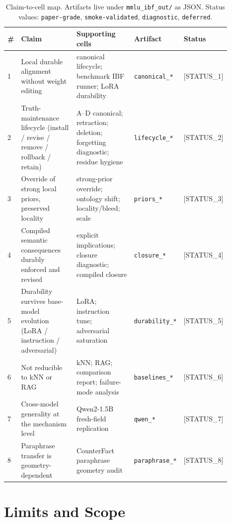 \documentclass[11pt,twocolumn]{article}
\newcommand{\PH}[1]{[\textsc{#1}]}
\theoremstyle{plain}
\begin{document}
\begin{table}[t]
\centering
\small
\setlength{\tabcolsep}{4pt}
\begin{tabular}{p{0.03\linewidth} p{0.30\linewidth} p{0.30\linewidth} p{0.13\linewidth} p{0.13\linewidth}}
\toprule
\# & Claim & Supporting cells & Artifact & Status \\
\midrule
1 & Local durable alignment without weight editing & canonical lifecycle; benchmark IBF runner; LoRA durability & \texttt{canonical\_*} & \PH{STATUS\_1} \\
2 & Truth-maintenance lifecycle (install / revise / remove / rollback / retain) & A--D canonical; retraction; deletion; forgetting diagnostic; residue hygiene & \texttt{lifecycle\_*} & \PH{STATUS\_2} \\
3 & Override of strong local priors, preserved locality & strong-prior override; ontology shift; locality/bleed; scale & \texttt{priors\_*} & \PH{STATUS\_3} \\
4 & Compiled semantic consequences durably enforced and revised & explicit implications; closure diagnostic; compiled closure & \texttt{closure\_*} & \PH{STATUS\_4} \\
5 & Durability survives base-model evolution (LoRA / instruction / adversarial) & LoRA; instruction tune; adversarial saturation & \texttt{durability\_*} & \PH{STATUS\_5} \\
6 & Not reducible to kNN or RAG & kNN; RAG; comparison report; failure-mode analysis & \texttt{baselines\_*} & \PH{STATUS\_6} \\
7 & Cross-model generality at the mechanism level & Qwen2-1.5B fresh-field replication & \texttt{qwen\_*} & \PH{STATUS\_7} \\
8 & Paraphrase transfer is geometry-dependent & CounterFact paraphrase geometry audit & \texttt{paraphrase\_*} & \PH{STATUS\_8} \\
\bottomrule
\end{tabular}
\caption{Claim-to-cell map. Artifacts live under \texttt{mmlu\_ibf\_out/} as JSON. Status values: \texttt{paper-grade}, \texttt{smoke-validated}, \texttt{diagnostic}, \texttt{deferred}.}
\label{tab:claim-map}
\end{table}

\section{Limits and Scope}
\label{sec:limits}
\end{document}

